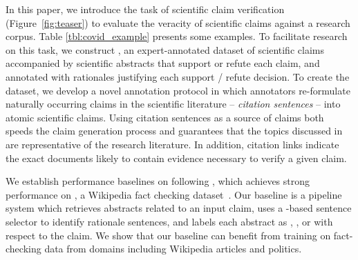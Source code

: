 

In this paper, we introduce the task of scientific claim verification (Figure~\ref{fig:teaser}) to evaluate the veracity of scientific claims against a research corpus. Table \ref{tbl:covid_example} presents some examples. To facilitate research on this task, we construct \ours, an expert-annotated dataset of \numclaims scientific claims accompanied by scientific abstracts that support or refute each claim, and annotated with rationales \cite{Lei2016RationalizingNP} justifying each support / refute decision. To create the dataset, we develop a novel annotation protocol in which annotators re-formulate naturally occurring claims in the scientific literature -- \emph{citation sentences} -- into atomic scientific claims. Using citation sentences as a source of claims both speeds the claim generation process and guarantees that the topics discussed in \ours are representative of the research literature. In addition, citation links indicate the exact documents likely to contain evidence necessary to verify a given claim.

We establish performance baselines on \ours following \citet{DeYoung2019ERASERAB}, which achieves strong performance on \fever, a Wikipedia fact checking dataset~\cite{Thorne2018FEVERAL}. Our baseline is a pipeline system which retrieves abstracts related to an input claim, uses a \bert-based \cite{Devlin2019BERTPO} sentence selector to identify rationale sentences, and labels each abstract as \supports, , or \notenough with respect to the claim. We show that our baseline can benefit from training on fact-checking data from domains including Wikipedia articles and politics.  %


